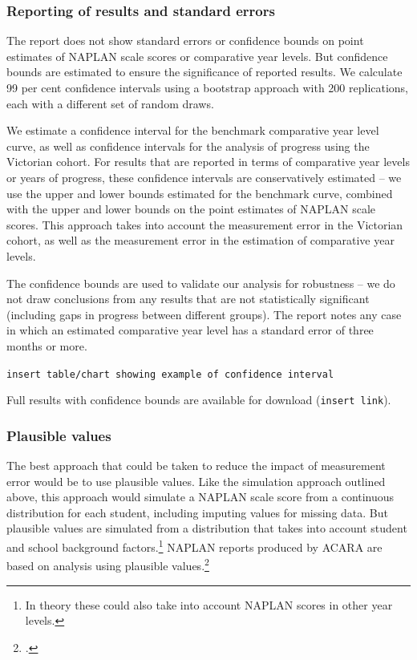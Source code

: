 \subsubsection*{Reporting of results and standard errors}

The report does not show standard errors or confidence bounds on point estimates of NAPLAN scale scores or comparative year levels. But confidence bounds are estimated to ensure the significance of reported results. We calculate 99 per cent confidence intervals using a bootstrap approach with 200 replications, each with a different set of random draws.

We estimate a confidence interval for the benchmark comparative year level curve, as well as confidence intervals for the analysis of progress using the Victorian cohort. For results that are reported in terms of comparative year levels or years of progress, these confidence intervals are conservatively estimated -- we use the upper and lower bounds estimated for the benchmark curve, combined with the upper and lower bounds on the point estimates of NAPLAN scale scores. This approach takes into account the measurement error in the Victorian cohort, as well as the measurement error in the estimation of comparative year levels.

The confidence bounds are used to validate our analysis for robustness -- we do not draw conclusions from any results that are not statistically significant (including gaps in progress between different groups). The report notes any case in which an estimated comparative year level has a standard error of three months or more. 

\verb+insert table/chart showing example of confidence interval+

Full results with confidence bounds are available for download (\verb+insert link+).

\subsubsection*{Plausible values}

The best approach that could be taken to reduce the impact of measurement error would be to use plausible values. Like the simulation approach outlined above, this approach would simulate a NAPLAN scale score from a continuous distribution for each student, including imputing values for missing data. But plausible values are simulated from a distribution that takes into account student and school background factors.\footnote{In theory these could also take into account NAPLAN scores in other year levels.} NAPLAN reports produced by ACARA are based on analysis using plausible values.\footcite[][22]{acara2015a}

